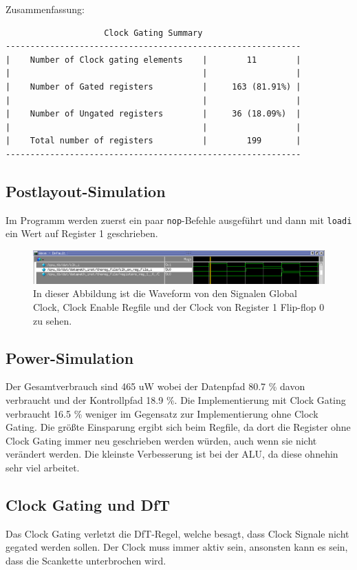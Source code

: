 \documentclass[12pt,a4paper]{article}
\begin{document}
Zusammenfassung:
\begin{verbatim}
                    Clock Gating Summary
------------------------------------------------------------
|    Number of Clock gating elements    |        11        |
|                                       |                  |
|    Number of Gated registers          |     163 (81.91%) |
|                                       |                  |
|    Number of Ungated registers        |     36 (18.09%)  |
|                                       |                  |
|    Total number of registers          |        199       |
------------------------------------------------------------
\end{verbatim}

\subsection{Postlayout-Simulation}
Im Programm werden zuerst ein paar \texttt{nop}-Befehle ausgeführt und dann mit \texttt{loadi} ein Wert auf Register 1 geschrieben.

\begin{figure}[ht]
\centering
\includegraphics[width=\textwidth]{setregwave}
\caption{In dieser Abbildung ist die Waveform von den Signalen Global Clock, Clock Enable Regfile und der Clock von Register 1 Flip-flop 0 zu sehen.}
\label{fig_setregwave}
\end{figure}

\subsection{Power-Simulation}
Der Gesamtverbrauch sind 465 uW wobei der Datenpfad 80.7 \% davon verbraucht und der Kontrollpfad 18.9 \%. Die Implementierung mit Clock Gating verbraucht 16.5 \% weniger im Gegensatz zur Implementierung ohne Clock Gating. Die größte Einsparung ergibt sich beim Regfile, da dort die Register ohne Clock Gating immer neu geschrieben werden würden, auch wenn sie nicht verändert werden. Die kleinste Verbesserung ist bei der ALU, da diese ohnehin sehr viel arbeitet.

\subsection{Clock Gating und DfT}
Das Clock Gating verletzt die DfT-Regel, welche besagt, dass Clock Signale nicht gegated werden sollen. Der Clock muss immer aktiv sein, ansonsten kann es sein, dass die Scankette unterbrochen wird.



%
\end{document}
